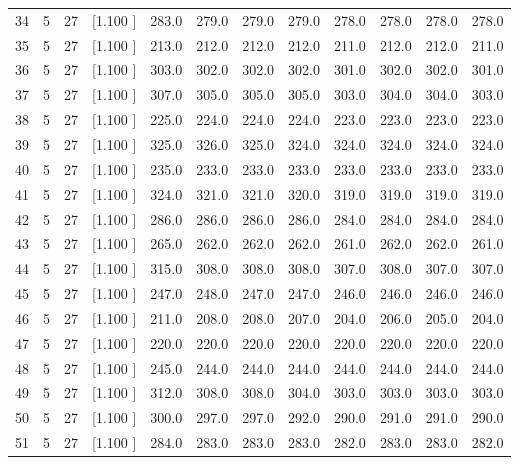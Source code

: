 \documentclass[12pt,a4paper]{article}
\begin{document}
\begin{center}
{\begin{tabular}{r r r r r r r r r r r r}
  34&  5& 27&[1.100     ]&   283.0&   279.0&   279.0&   279.0&   278.0&   278.0&   278.0&   278.0\\[-0.02in]
  35&  5& 27&[1.100     ]&   213.0&   212.0&   212.0&   212.0&   211.0&   212.0&   212.0&   211.0\\[-0.02in]
  36&  5& 27&[1.100     ]&   303.0&   302.0&   302.0&   302.0&   301.0&   302.0&   302.0&   301.0\\[-0.02in]
  37&  5& 27&[1.100     ]&   307.0&   305.0&   305.0&   305.0&   303.0&   304.0&   304.0&   303.0\\[-0.02in]
  38&  5& 27&[1.100     ]&   225.0&   224.0&   224.0&   224.0&   223.0&   223.0&   223.0&   223.0\\[-0.02in]
  39&  5& 27&[1.100     ]&   325.0&   326.0&   325.0&   324.0&   324.0&   324.0&   324.0&   324.0\\[-0.02in]
  40&  5& 27&[1.100     ]&   235.0&   233.0&   233.0&   233.0&   233.0&   233.0&   233.0&   233.0\\[-0.02in]
  41&  5& 27&[1.100     ]&   324.0&   321.0&   321.0&   320.0&   319.0&   319.0&   319.0&   319.0\\[-0.02in]
  42&  5& 27&[1.100     ]&   286.0&   286.0&   286.0&   286.0&   284.0&   284.0&   284.0&   284.0\\[-0.02in]
  43&  5& 27&[1.100     ]&   265.0&   262.0&   262.0&   262.0&   261.0&   262.0&   262.0&   261.0\\[-0.02in]
  44&  5& 27&[1.100     ]&   315.0&   308.0&   308.0&   308.0&   307.0&   308.0&   307.0&   307.0\\[-0.02in]
  45&  5& 27&[1.100     ]&   247.0&   248.0&   247.0&   247.0&   246.0&   246.0&   246.0&   246.0\\[-0.02in]
  46&  5& 27&[1.100     ]&   211.0&   208.0&   208.0&   207.0&   204.0&   206.0&   205.0&   204.0\\[-0.02in]
  47&  5& 27&[1.100     ]&   220.0&   220.0&   220.0&   220.0&   220.0&   220.0&   220.0&   220.0\\[-0.02in]
  48&  5& 27&[1.100     ]&   245.0&   244.0&   244.0&   244.0&   244.0&   244.0&   244.0&   244.0\\[-0.02in]
  49&  5& 27&[1.100     ]&   312.0&   308.0&   308.0&   304.0&   303.0&   303.0&   303.0&   303.0\\[-0.02in]
  50&  5& 27&[1.100     ]&   300.0&   297.0&   297.0&   292.0&   290.0&   291.0&   291.0&   290.0\\[-0.02in]
  51&  5& 27&[1.100     ]&   284.0&   283.0&   283.0&   283.0&   282.0&   283.0&   283.0&   282.0\\[-0.02in]

\end{tabular}}
\end{center}
\end{document}
